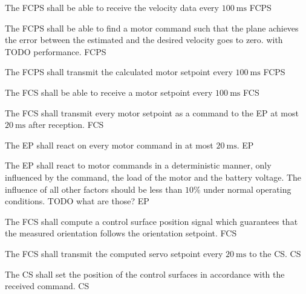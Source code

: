 {
			The FCPS shall be able to receive the velocity data every $\SI{100}{\milli\second}$
		}
{  }
{FCPS}

{
			The FCPS shall be able to find a motor command such that the plane achieves the error between the estimated 
			and the desired velocity goes to zero. with TODO performance.
		}
{  }
{FCPS}

{
			The FCPS shall transmit the calculated motor setpoint every $\SI{100}{\milli\second}$
		}
{  }
{FCPS}

{
			The FCS shall be able to receive a motor setpoint every $\SI{100}{\milli\second}$
		}
{  }
{FCS}

{
			The FCS shall transmit every motor setpoint as a command to the EP at most $\SI{20}{\milli\second}$ after reception.
		}
{  }
{FCS}

{
			The EP shall react on every motor command in at most $\SI{20}{\milli\second}$.
		}
{  }
{EP}

{
			The EP shall react to motor commands in a deterministic manner, only influenced by the command, 
			the load of the motor and the battery voltage. 
			The influence of all other factors should be less than $10\%$ under normal operating conditions. 
			TODO what are those?
		}
{  }
{EP}

{
			The FCS shall compute a control surface position signal which guarantees that the measured orientation 
			follows the orientation setpoint.
		}
{   }
{FCS}

{
			The FCS shall transmit the computed servo setpoint every $\SI{20}{\milli\second}$ to the CS.
		}
{   }
{CS}

{
			The CS shall set the position of the control surfaces in accordance with the received command.
		}
{   }
{CS}

